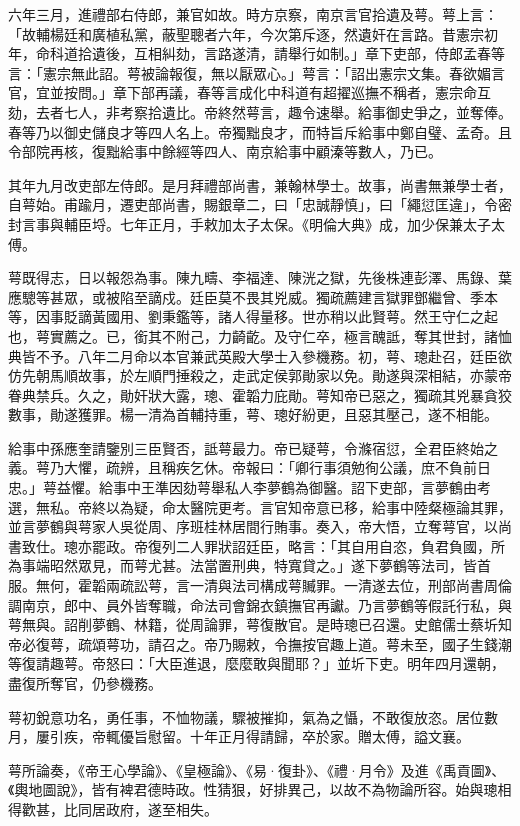 \begin{pinyinscope}
六年三月，進禮部右侍郎，兼官如故。時方京察，南京言官拾遺及萼。萼上言：「故輔楊廷和廣植私黨，蔽聖聰者六年，今次第斥逐，然遺奸在言路。昔憲宗初年，命科道拾遺後，互相糾劾，言路遂清，請舉行如制。」章下吏部，侍郎孟春等言：「憲宗無此詔。萼被論報復，無以厭眾心。」萼言：「詔出憲宗文集。春欲媚言官，宜並按問。」章下部再議，春等言成化中科道有超擢巡撫不稱者，憲宗命互劾，去者七人，非考察拾遺比。帝終然萼言，趣令速舉。給事御史爭之，並奪俸。春等乃以御史儲良才等四人名上。帝獨黜良才，而特旨斥給事中鄭自璧、孟奇。且令部院再核，復黜給事中餘經等四人、南京給事中顧溱等數人，乃已。

其年九月改吏部左侍郎。是月拜禮部尚書，兼翰林學士。故事，尚書無兼學士者，自萼始。甫踰月，遷吏部尚書，賜銀章二，曰「忠誠靜慎」，曰「繩愆匡違」，令密封言事與輔臣埒。七年正月，手敕加太子太保。《明倫大典》成，加少保兼太子太傅。

萼既得志，日以報怨為事。陳九疇、李福達、陳洸之獄，先後株連彭澤、馬錄、葉應驄等甚眾，或被陷至謫戍。廷臣莫不畏其兇威。獨疏薦建言獄罪鄧繼曾、季本等，因事貶謫黃國用、劉秉鑑等，諸人得量移。世亦稍以此賢萼。然王守仁之起也，萼實薦之。已，銜其不附己，力齮齕。及守仁卒，極言醜詆，奪其世封，諸恤典皆不予。八年二月命以本官兼武英殿大學士入參機務。初，萼、璁赴召，廷臣欲仿先朝馬順故事，於左順門捶殺之，走武定侯郭勛家以免。勛遂與深相結，亦蒙帝眷典禁兵。久之，勛奸狀大露，璁、霍韜力庇勛。萼知帝已惡之，獨疏其兇暴貪狡數事，勛遂獲罪。楊一清為首輔持重，萼、璁好紛更，且惡其壓己，遂不相能。

給事中孫應奎請鑒別三臣賢否，詆萼最力。帝已疑萼，令滌宿愆，全君臣終始之義。萼乃大懼，疏辨，且稱疾乞休。帝報曰：「卿行事須勉徇公議，庶不負前日忠。」萼益懼。給事中王準因劾萼舉私人李夢鶴為御醫。詔下吏部，言夢鶴由考選，無私。帝終以為疑，命太醫院更考。言官知帝意已移，給事中陸粲極論其罪，並言夢鶴與萼家人吳從周、序班桂林居間行賄事。奏入，帝大悟，立奪萼官，以尚書致仕。璁亦罷政。帝復列二人罪狀詔廷臣，略言：「其自用自恣，負君負國，所為事端昭然眾見，而萼尤甚。法當置刑典，特寬貸之。」遂下夢鶴等法司，皆首服。無何，霍韜兩疏訟萼，言一清與法司構成萼贓罪。一清遂去位，刑部尚書周倫調南京，郎中、員外皆奪職，命法司會錦衣鎮撫官再讞。乃言夢鶴等假託行私，與萼無與。詔削夢鶴、林籍，從周論罪，萼復散官。是時璁已召還。史館儒士蔡圻知帝必復萼，疏頌萼功，請召之。帝乃賜敕，令撫按官趣上道。萼未至，國子生錢潮等復請趣萼。帝怒曰：「大臣進退，麼麼敢與聞耶？」並圻下吏。明年四月還朝，盡復所奪官，仍參機務。

萼初銳意功名，勇任事，不恤物議，驟被摧抑，氣為之懾，不敢復放恣。居位數月，屢引疾，帝輒優旨慰留。十年正月得請歸，卒於家。贈太傅，謚文襄。

萼所論奏，《帝王心學論》、《皇極論》、《易·復卦》、《禮·月令》及進《禹貢圖》、《輿地圖說》，皆有裨君德時政。性猜狠，好排異己，以故不為物論所容。始與璁相得歡甚，比同居政府，遂至相失。


\end{pinyinscope}
